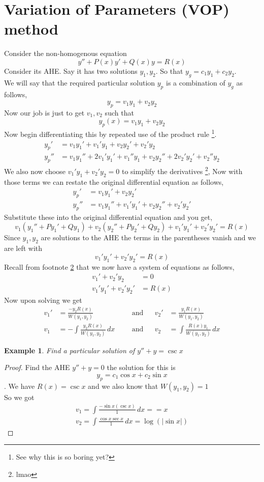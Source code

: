 \documentclass[oneside,11pt,pdftex,final]{book}%
\numberwithin{equation}{section}
\newtheorem{example}[theorem]{Example}
\numberwithin{section}{chapter}
\numberwithin{equation}{chapter}
\begin{document}
\section{Variation of Parameters (VOP) method}
Consider the non-homogenous equation
\[ y''+P(x)y'+Q(x)y=R(x) \]
Consider its AHE. Say it has two solutions $ y_1, y_2$. So that $ y_g= c_1y_1+c_2y_2$.\\
We will say that the required particular solution $ y_p $ is a combination of $ y_g $ as follows,\[ y_p=v_1 y_1+v_2y_2 \]
Now our job is just to get $ v_1,v_2 $ such that
\[ y_p(x)=v_1y_1+v_2y_2 \]
Now begin differentiating this by repeated use of the product rule \footnote{See why this is so boring yet?}.
\begin{align*}
	y_p'&=v_1y_1'+v_1'y_1+v_2y_2'+v_2'y_2\\
	y_p''&=v_1y_1''+2v_1'y_1'+v_1''y_1+v_2y_2''+2v_2'y_2'+v_2''y_2
\end{align*}
We also now choose $ v_1'y_1+v_2'y_2=0 $ to simplify the derivatives \footnote{\label{lmao}lmao},
Now with those terms we can restate the original differential equation as follows, 
\begin{align*}
	y_p'&=v_1y_1'+v_2y_2'\\
	y_p''&=v_1y_1''+v_1'y_1'+v_2y_2''+v_2'y_2'
\end{align*}
Substitute these into the original differential equation and you get,
\[ v_1(y_1''+Py_1'+Qy_1)+v_2(y_2''+Py_2'+Qy_2)+v_1'y_1'+v_2'y_2'=R(x) \]
Since $ y_1, y_2 $ are solutions to the AHE the terms in the parentheses vanish and we are left with
\[ v_1'y_1'+v_2'y_2'=R(x) \]
Recall from footnote \ref{lmao} that we now have a system of equations as follows,
\begin{align*}
	v_1'+v_2'y_2&=0\\
	v_1'y_1'+v_2'y_2'&=R(x)
\end{align*}
Now upon solving we get 
\begin{align*}
	v_1' &= \frac{-y_2R(x)}{W(y_1,y_2)} && &\text{and} && v_2' &= \frac{y_1R(x)}{W(y_1,y_2)}\\
	v_1 &= -\int \frac{y_2R(x)}{W(y_1,y_2)}\, dx && &\text{and} && v_2 &= \int \frac{R(x)y_1}{W(y_1,y_2)}\, dx
\end{align*}



\begin{example}
	Find a particular solution of $ y''+y=\csc x $
\end{example}
\begin{proof}
	Find the AHE $ y''+y=0 $ the solution for this is $$ y_p=c_1 \cos x + c_2 \sin x $$.
	We have $ R(x)=\csc x $ and we also know that $ W(y_1,y_2)= 1$\\
	So we got 
	\begin{align*}
		v_1=\int \frac{- \sin x (\csc x)}{1}\, dx = =x\\
		v_2= \int \frac{\cos x \sec x}{1}\, dx = \log (|\sin x|)
	\end{align*}
\end{proof}
\end{document}
